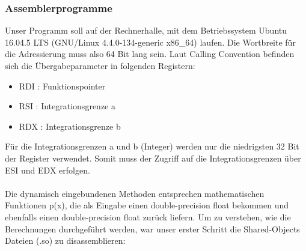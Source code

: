 \documentclass[course=erap]{aspdoc}
\begin{document}
\subsubsection{Assemblerprogramme}
Unser Programm soll auf der Rechnerhalle, mit dem Betriebssystem Ubuntu 16.04.5 LTS (GNU/Linux 4.4.0-134-generic x86\_64) laufen. Die Wortbreite für die Adressierung muss also 64 Bit lang sein. Laut Calling Convention befinden sich die Übergabeparameter in folgenden Registern:

\begin{itemize}
\item RDI : Funktionspointer
\item RSI : Integrationsgrenze a
\item RDX : Integrationsgrenze b
\end{itemize}
Für die Integrationsgrenzen a und b (Integer) werden nur die niedrigsten 32 Bit der Register verwendet. Somit muss der Zugriff auf die Integrationsgrenzen über ESI und EDX erfolgen.\\
\\
Die dynamisch eingebundenen Methoden entsprechen mathematischen Funktionen p(x), die als Eingabe einen double-precision float bekommen und ebenfalls einen double-precision float zurück liefern. Um zu verstehen, wie die Berechnungen durchgeführt werden, war unser erster Schritt die Shared-Objects Dateien (.so) zu disassemblieren:
\end{document}
